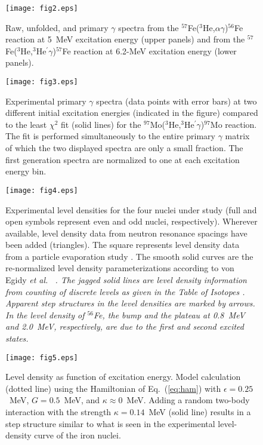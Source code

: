\clearpage

\begin{figure}\centering
\texttt{[image: fig2.eps]}
\caption{Raw, unfolded, and primary $\gamma$ spectra from the 
$^{57}$Fe($^3$He,$\alpha\gamma$)$^{56}$Fe reaction at 5~MeV excitation energy 
(upper panels) and from the $^{57}$Fe($^3$He,$^3$He$^\prime\gamma$)$^{57}$Fe 
reaction at 6.2-MeV excitation energy (lower panels).}
\label{fig:feraw}
\end{figure}

\clearpage

\begin{figure}\centering
\texttt{[image: fig3.eps]}
\caption{Experimental primary $\gamma$ spectra (data points with error bars) at
two different initial excitation energies (indicated in the figure) compared to
the least $\chi^2$ fit (solid lines) for the 
$^{97}$Mo($^3$He,$^3$He$^\prime\gamma$)$^{97}$Mo reaction. The fit is performed
simultaneously to the entire primary $\gamma$ matrix of which the two displayed
spectra are only a small fraction. The first generation spectra are normalized
to one at each excitation energy bin.}
\label{fig:fgmo}
\end{figure}

\clearpage

\begin{figure}\centering
\texttt{[image: fig4.eps]}
\caption{Experimental level densities for the four nuclei under study (full and
open symbols represent even and odd nuclei, respectively). Wherever available, 
level density data from neutron resonance spacings have been added (triangles).
The square represents level density data from a particle evaporation study 
\protect\cite{FT84}. The smooth solid curves are the re-normalized level 
density parameterizations according to von Egidy \sl et al.\ \rm 
\protect\cite{ES88}. The jagged solid lines are level density information from
counting of discrete levels as given in the Table of Isotopes 
\protect\cite{FS96}. Apparent step structures in the level densities are marked
by arrows. In the level density of $^{56}$Fe, the bump and the plateau at 
0.8~MeV and 2.0~MeV, respectively, are due to the first and second excited 
states.}
\label{fig:levdens}
\end{figure}

\clearpage

\begin{figure}\centering
\texttt{[image: fig5.eps]}
\caption{Level density as function of excitation energy. Model calculation 
(dotted line) using the Hamiltonian of Eq.\ (\protect\ref{eq:ham}) with 
$\epsilon=0.25$~MeV, $G=0.5$~MeV, and $\kappa\approx 0$~MeV\@. Adding a random 
two-body interaction with the strength $\kappa=0.14$~MeV (solid line) results 
in a step structure similar to what is seen in the experimental level-density 
curve of the iron nuclei.}
\label{fig:calc}
\end{figure}


